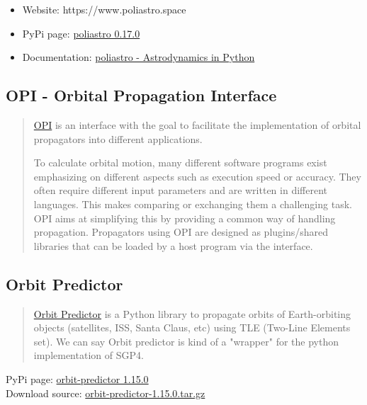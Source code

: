 \begin{itemize}
	\item Website: https://www.poliastro.space
	\item PyPi page: \href{https://pypi.org/project/poliastro/}{poliastro 0.17.0}
	\item Documentation: \href{https://docs.poliastro.space/en/stable/}{poliastro - Astrodynamics in Python}
\end{itemize}


\subsection{OPI - Orbital Propagation Interface}
\begin{quotation}
\href{https://github.com/Space-Systems/OPI}{OPI} is an interface with the goal to facilitate the implementation of orbital propagators into different applications.

To calculate orbital motion, many different software programs exist emphasizing on different aspects such as execution speed or accuracy. They often require different input parameters and are written in different languages. This makes comparing or exchanging them a challenging task. OPI aims at simplifying this by providing a common way of handling propagation. Propagators using OPI are designed as plugins/shared libraries that can be loaded by a host program via the interface.
\end{quotation}

\subsection{Orbit Predictor}
\begin{quotation}
\href{https://github.com/satellogic/orbit-predictor}{Orbit Predictor} is a Python library to propagate orbits of Earth-orbiting objects (satellites, ISS, Santa Claus, etc) using TLE (Two-Line Elements set). We can say Orbit predictor is kind of a "wrapper" for the python implementation of SGP4.
\end{quotation}

PyPi page: \href{https://pypi.org/project/orbit-predictor/}{orbit-predictor 1.15.0} \\
Download source: \href{https://files.pythonhosted.org/packages/c2/98/c1497925d73f522d17a2db3e704a85fdad17fcd191464b82fad82e73aedb/orbit-predictor-1.15.0.tar.gz}{orbit-predictor-1.15.0.tar.gz}


